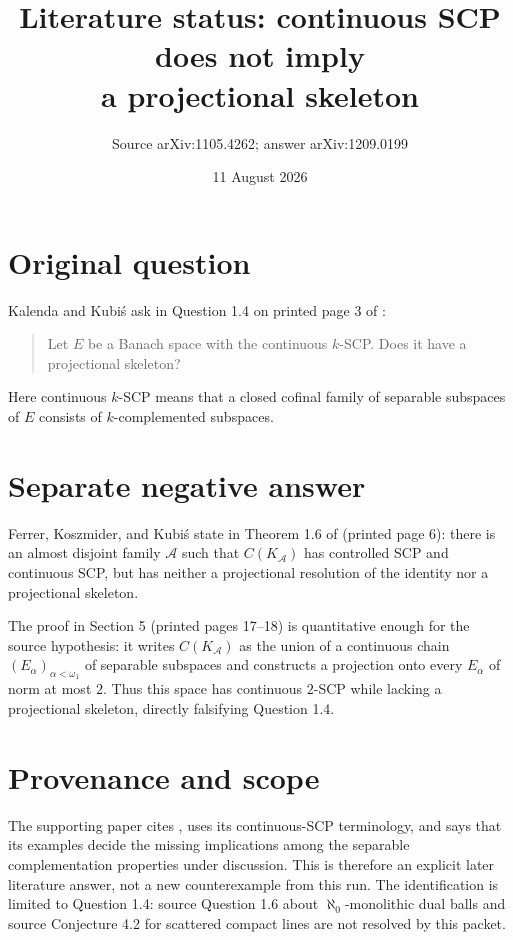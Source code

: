 \documentclass[11pt]{article}
\title{Literature status: continuous SCP does not imply\\a projectional skeleton}
\author{Source arXiv:1105.4262; answer arXiv:1209.0199}
\date{11 August 2026}
\begin{document}
\maketitle

\begin{center}
\end{center}

\section*{Original question}

Kalenda and Kubi\'s ask in Question 1.4 on printed page 3 of
\cite{KalendaKubis}:
\begin{quote}
Let $E$ be a Banach space with the continuous $k$-SCP. Does it have a
projectional skeleton?
\end{quote}
Here continuous $k$-SCP means that a closed cofinal family of separable
subspaces of $E$ consists of $k$-complemented subspaces.

\section*{Separate negative answer}

Ferrer, Koszmider, and Kubi\'s state in Theorem 1.6 of \cite{FerrerEtAl}
(printed page 6): there is an almost disjoint family $\mathcal A$ such that
$C(K_{\mathcal A})$ has controlled SCP and continuous SCP, but has neither a
projectional resolution of the identity nor a projectional skeleton.

The proof in Section 5 (printed pages 17--18) is quantitative enough for the
source hypothesis: it writes $C(K_{\mathcal A})$ as the union of a continuous
chain $(E_\alpha)_{\alpha<\omega_1}$ of separable subspaces and constructs a
projection onto every $E_\alpha$ of norm at most $2$. Thus this space has
continuous $2$-SCP while lacking a projectional skeleton, directly falsifying
Question 1.4.

\section*{Provenance and scope}

The supporting paper cites \cite{KalendaKubis}, uses its continuous-SCP
terminology, and says that its examples decide the missing implications among
the separable complementation properties under discussion. This is therefore
an explicit later literature answer, not a new counterexample from this run.
The identification is limited to Question 1.4: source Question 1.6 about
$\aleph_0$-monolithic dual balls and source Conjecture 4.2 for scattered compact
lines are not resolved by this packet.
\end{document}
